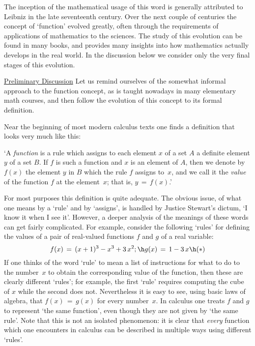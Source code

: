         The inception of the mathematical usage of this word is generally attributed to Leibniz in the late seventeenth century.
    Over the next couple of centuries the concept of `function' evolved greatly, often through the requirements of applications of mathematics to the sciences.
    The study of this evolution can be found in many books, and provides many insights into how mathematics actually develops in the real world.
    In the discussion below we consider only the very final stages of this evolution.

\V

        \underline{Preliminary Discussion} Let us remind ourselves of the somewhat informal approach to the function concept,
    as is taught nowadays in many elementary math courses, and then follow the evolution of this concept to its formal definition.

\V

        Near the beginning of most modern calculus texts one finds a definition that looks very much like this:

\V

        `A {\em function} is a rule which assigns to each element $x$ of a set $A$ a definite element $y$ of a set $B$.
    If $f$ is such a function and $x$ is an element of $A$, then we denote by $f(x)$ the element $y$ in $B$ which the rule $f$ assigns to~$x$,
    and we call it the {\em value} of the function $f$ at the element~$x$; that is, $y \,=\, f(x)$.'

\V

        For most purposes this definition is quite adequate. The obvious issue, of what one means by a `rule' and by `assigns',
    is handled by Justice Stewart's dictum,  `I know it when I see it'. However, a deeper analysis of the meanings of these words can get fairly complicated.
    For example, consider the following `rules' for defining the values of a pair of real-valued functions $f$ and $g$ of a real variable:
        \begin{displaymath}
        f(x) \,=\, (x+1)^{3} - x^{3} + 3\,x^{2}; \h g(x) \,=\, 1 - 3\,x \h ({\ast})
        \end{displaymath}
    If one thinks of the word `rule' to mean a list of instructions for what to do to the number~$x$ to obtain the corresponding value of the function,
    then these are clearly different `rules'; for example, the first `rule' requires computing the cube of $x$ while the second does not.
    Nevertheless it is easy to see, using basic laws of algebra, that $f(x) \,=\, g(x)$ for every number~$x$.
    In calculus one treats $f$ and $g$ to represent `the same function', even though they are not given by `the same rule'.
    Note that this is not an isolated phenomenon: it is clear that {\em every} function
    which one encounters in calculus can be described in multiple ways using different `rules'.

